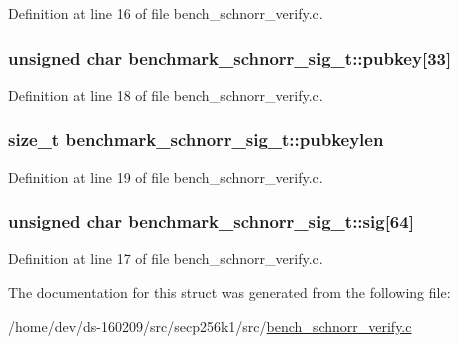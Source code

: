 Definition at line 16 of file bench\+\_\+schnorr\+\_\+verify.\+c.

\hypertarget{structbenchmark__schnorr__sig__t_ae39c82dca3bb449e702b126a60b34583}{}
\subsubsection[{pubkey}]{\setlength{\rightskip}{0pt plus 5cm}unsigned char benchmark\+\_\+schnorr\+\_\+sig\+\_\+t\+::pubkey\mbox{[}33\mbox{]}}\label{structbenchmark__schnorr__sig__t_ae39c82dca3bb449e702b126a60b34583}


Definition at line 18 of file bench\+\_\+schnorr\+\_\+verify.\+c.

\hypertarget{structbenchmark__schnorr__sig__t_a14587cc26e44b3bc38c109f970edc6c2}{}
\subsubsection[{pubkeylen}]{\setlength{\rightskip}{0pt plus 5cm}size\+\_\+t benchmark\+\_\+schnorr\+\_\+sig\+\_\+t\+::pubkeylen}\label{structbenchmark__schnorr__sig__t_a14587cc26e44b3bc38c109f970edc6c2}


Definition at line 19 of file bench\+\_\+schnorr\+\_\+verify.\+c.

\hypertarget{structbenchmark__schnorr__sig__t_a0d16a9e3a795fe2ff06e8ff1af30ab43}{}
\subsubsection[{sig}]{\setlength{\rightskip}{0pt plus 5cm}unsigned char benchmark\+\_\+schnorr\+\_\+sig\+\_\+t\+::sig\mbox{[}64\mbox{]}}\label{structbenchmark__schnorr__sig__t_a0d16a9e3a795fe2ff06e8ff1af30ab43}


Definition at line 17 of file bench\+\_\+schnorr\+\_\+verify.\+c.



The documentation for this struct was generated from the following file\+:\begin{DoxyCompactItemize}
\item 
/home/dev/ds-\/160209/src/secp256k1/src/\hyperlink{bench__schnorr__verify_8c}{bench\+\_\+schnorr\+\_\+verify.\+c}\end{DoxyCompactItemize}
